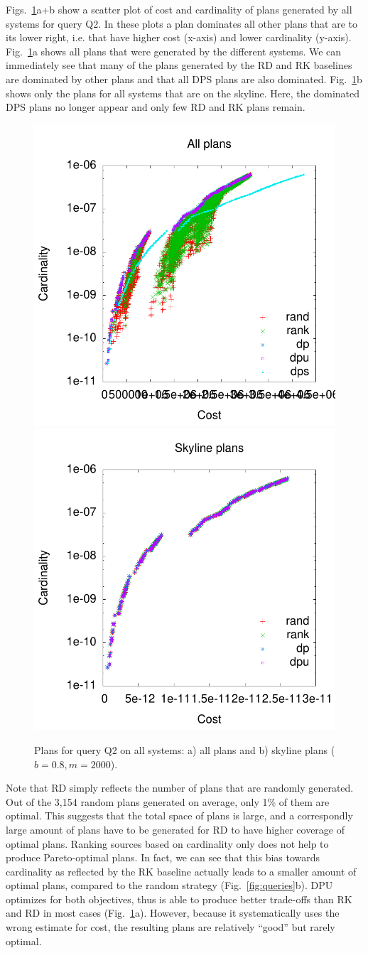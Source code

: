 Figs.~\ref{fig:pareto_q2_skyline}a+b show a
scatter plot of cost and cardinality of plans generated by all systems
for query Q2. In these plots a plan dominates all other plans that are to
its lower right, i.e. that have higher cost (x-axis) and lower
cardinality (y-axis). Fig.~\ref{fig:pareto_q2_skyline}a shows all
plans that were generated by the different systems. We can immediately
see that many of the plans generated by the RD and RK baselines are
dominated by other plans and that all DPS plans are also
dominated. Fig.~\ref{fig:pareto_q2_skyline}b shows only the plans for
all systems that are on the skyline. Here, the dominated DPS plans no
longer appear and only few RD and RK plans remain.

\begin{figure}[htb]
  \centering
  \includegraphics[width=0.49\linewidth]{figs/plans_q2_all.pdf}
  \includegraphics[width=0.49\linewidth]{figs/plans_q2_sky.pdf}
  \caption{Plans for query Q2 on all systems: a) all plans and b)
    skyline plans ($b=0.8,m=2000$).}
  \label{fig:pareto_q2_skyline}
\end{figure}

Note that RD simply reflects the number of plans that are randomly generated. Out of the 3,154 random plans generated on average, only 1\% of them are optimal. This suggests that the total space of plans is large, and a correspondly large amount of plans have to be generated for RD to have higher coverage of optimal plans. 
Ranking sources based on cardinality only does not help to produce Pareto-optimal plans. In fact, we can see that this bias towards cardinality as reflected by the RK baseline actually leads to a smaller amount of optimal plans, compared to the random strategy (Fig.~\ref{fig:queries}b). DPU optimizes for both objectives, thus is able to produce better trade-offs than RK and RD in most cases (Fig.~\ref{fig:pareto_q2_skyline}a). However, because it systematically uses the wrong estimate for cost, the resulting plans are relatively ``good'' but rarely optimal. 

